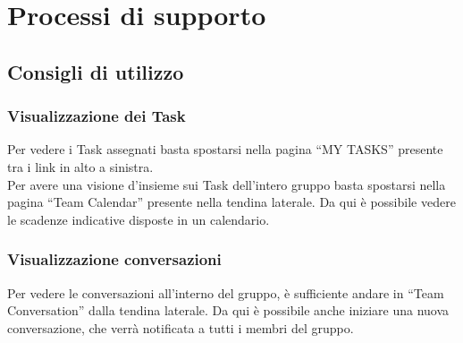 \documentclass[../NormeDiProgetto.tex]{subfiles}
\begin{document}
	\section{Processi di supporto}
		
		\subsection{Consigli di utilizzo}
			\subsubsection{Visualizzazione dei Task}
				Per vedere i Task assegnati basta spostarsi nella pagina ``MY
				TASKS'' presente tra i link in alto a sinistra.\\
				Per avere una visione d'insieme sui Task dell'intero gruppo basta
				spostarsi nella pagina ``Team Calendar'' presente nella tendina
				laterale. Da qui è possibile vedere le scadenze indicative disposte
				in un calendario.
			\subsubsection{Visualizzazione conversazioni}
				Per vedere le conversazioni all'interno del gruppo, è sufficiente
				andare in ``Team Conversation'' dalla tendina laterale. Da qui è
				possibile anche iniziare una nuova conversazione, che verrà
				notificata a tutti i membri del gruppo.
\end{document}
